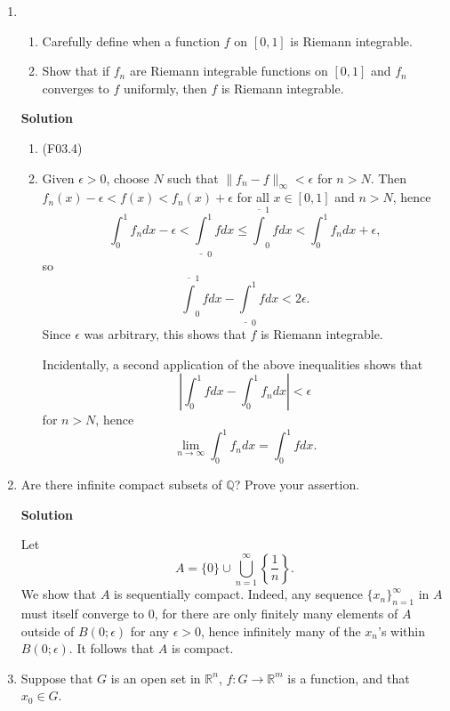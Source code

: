 \documentclass{article}
\begin{document}
\begin{enumerate}
\item

\begin{enumerate}
\item Carefully define when a function \(f\) on \([0,1]\) is Riemann integrable.

\item Show that if \(f_n\) are Riemann integrable functions on \([0,1]\) and \(f_n\) converges to \(f\) uniformly, then \(f\) is Riemann integrable.

\end{enumerate}

{\bf Solution}

\begin{enumerate}
\item (F03.4)

\item Given \(\epsilon > 0\), choose \(N\) such that \(\|f_n - f\|_{\infty} < \epsilon\) for \(n > N\).  Then \(f_n(x) - \epsilon < f(x) < f_n(x) + \epsilon\) for all \(x \in [0,1]\) and \(n > N\), hence
\[\int_0^1 f_n dx - \epsilon    < \underline{\int}_0^1 f dx
                             \leq \overline{\int}_0^1 f dx
                                < \int_0^1 f_n dx + \epsilon,\]
so
\[\overline{\int}_0^1 f dx - \underline{\int}_0^1 f dx < 2\epsilon.\]
Since \(\epsilon\) was arbitrary, this shows that \(f\) is Riemann integrable.

Incidentally, a second application of the above inequalities shows that
\[\left| \int_0^1 f dx - \int_0^1 f_n dx \right| < \epsilon\]
for \(n > N\), hence
\[\lim_{n \to \infty} \int_0^1 f_n dx = \int_0^1 f dx.\]

\end{enumerate}



\item Are there infinite compact subsets of \(\mathbb{Q}\)?  Prove your assertion.

{\bf Solution}

Let
\[A = \{0\} \cup \bigcup_{n = 1}^{\infty} \left\{ \frac{1}{n} \right\}.\]
We show that \(A\) is sequentially compact.  Indeed, any sequence \(\{x_n\}_{n = 1}^{\infty}\) in \(A\) must itself converge to \(0\), for there are only finitely many elements of \(A\) outside of \(B(0;\epsilon)\) for any \(\epsilon > 0\), hence infinitely many of the \(x_n\)'s within \(B(0;\epsilon)\).  It follows that \(A\) is compact.



\item Suppose that \(G\) is an open set in \(\mathbb{R}^n\), \(f : G \to \mathbb{R}^m\) is a function, and that \(x_0 \in G\).


\end{enumerate}
\end{document}
